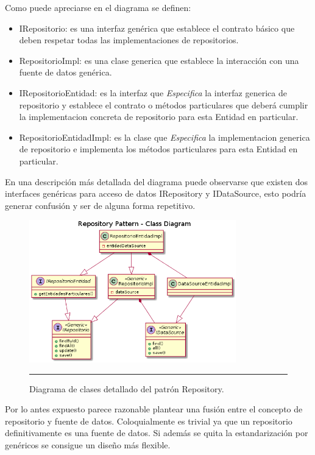 Como puede apreciarse en el diagrama se definen:
\begin{itemize}
	\item IRepositorio: es una interfaz genérica que establece el contrato básico que deben respetar todas las implementaciones de repositorios.
	\item RepositorioImpl: es una clase generica que establece la interacción con una fuente de datos genérica.
	\item IRepositorioEntidad: es la interfaz que \textit{Especifica} la interfaz generica de repositorio y establece el contrato o métodos particulares que deberá cumplir la implementacion concreta de repositorio para esta Entidad en particular.
	\item RepositorioEntidadImpl: es la clase que \textit{Especifica} la implementacion generica de repositorio e implementa los métodos particulares para esta Entidad en particular.
\end{itemize}

En una descripción más detallada del diagrama puede observarse que existen dos interfaces genéricas para acceso de datos IRepository y IDataSource, esto podría generar confusión y ser de alguna forma repetitivo.

\begin{figure}[htbp]
	\centering
	\includegraphics[width=0.8\textwidth]{Figures/uml_clases_detalles_repository.png}
	\rule{35em}{1pt}
	\caption[Repository Pattern Detailed Class Diagram]{Diagrama de clases detallado del patrón Repository.}
	\label{fig:uml_clases_detalles_repository}
\end{figure}

 Por lo antes expuesto parece razonable plantear una fusión entre el concepto de repositorio y fuente de datos. Coloquialmente es trivial ya que un repositorio definitivamente es una fuente de datos. Si además se quita la estandarización por genéricos se consigue un diseño más flexible.
 

